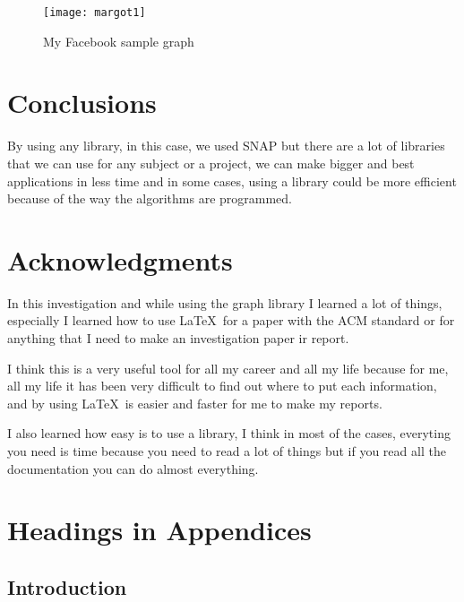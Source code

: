 \documentclass{sig-alternate-05-2015}
\begin{document}
\begin{figure}
\centering
\texttt{[image: margot1]}
\caption{My Facebook sample graph}
\end{figure}


\section{Conclusions}
By using any library, in this case, we used SNAP but there
are a lot of libraries that we can use for any subject or
a project, we can make bigger and best applications in less time
and in some cases, using a library could be more efficient
because of the way the algorithms are programmed.


\section{Acknowledgments}
In this investigation and while using the graph library
I learned a lot of things, especially I learned how to use
\LaTeX\ for a paper with the ACM standard or for anything that I
need to make an investigation paper ir report.

I think this is a very useful tool for all my career and all my life
because for me, all my life it has been very difficult to find out where
to put each information, and by using \LaTeX\ is easier and
faster for me to make my reports.

I also learned how easy is to use a library, I think in most of the
cases, everyting you need is time because you need to read a lot
of things but if you read all the documentation you can
do almost everything.

%

%
%
\appendix
\section{Headings in Appendices}
\subsection{Introduction}
\end{document}
